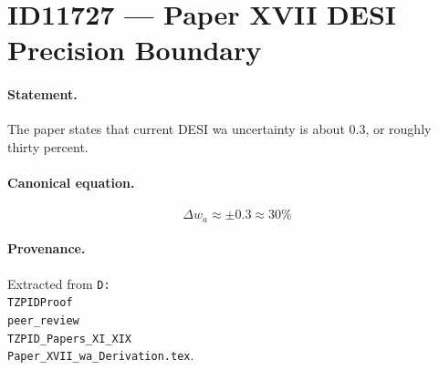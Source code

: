 \section*{ID11727 --- Paper XVII DESI Precision Boundary}

\paragraph{Statement.}
The paper states that current DESI wa uncertainty is about 0.3, or roughly thirty percent.

\paragraph{Canonical equation.}
\[
\Delta w_a\approx\pm0.3\approx30\%
\]

\paragraph{Provenance.}
Extracted from \texttt{D:\\TZPIDProof\\peer\_review\\TZPID\_Papers\_XI\_XIX\\Paper\_XVII\_wa\_Derivation.tex}.
